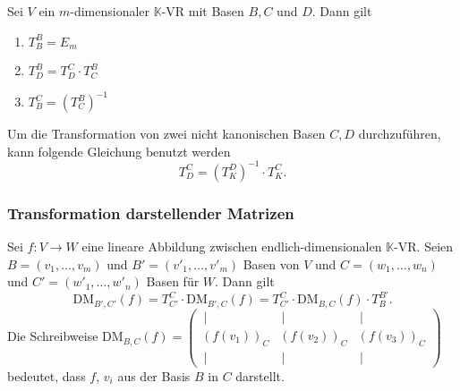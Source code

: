 \documentclass[a4paper,12pt]{article}
\begin{document}
Sei $V$ ein $m$-dimensionaler $\mathbb{K}$-VR mit Basen $B,C$ und $D$. Dann gilt
\begin{enumerate}[label=(\alph*)]
        \item $T^B_B=E_m$ 
        \item $T^B_D=T^C_D\cdot T^B_C$ 
        \item $T^C_B=\left(T^B_C\right)^{-1}$
\end{enumerate}
Um die Transformation von zwei nicht kanonischen Basen $C,D$ durchzuführen, kann folgende Gleichung benutzt werden
\[ 
        T^C_D=\left(T^D_K\right)^{-1}\cdot T^C_K
.\] 

\subsubsection{Transformation darstellender Matrizen}
Sei $f:V\rightarrow W$ eine lineare Abbildung zwischen endlich-dimensionalen $\mathbb{K}$-VR. Seien $B=\left(v_1,\hdots ,v_m\right)$ und $B'=\left(v'_1,\hdots ,v'_m\right)$ Basen von $V$ und $C=\left(w_1,\hdots ,w_n\right)$ und $C'=\left(w'_1,\hdots ,w'_n\right)$ Basen für $W$. Dann gilt
\[ 
        \text{DM}_{B',C'}\left(f\right)=T^C_{C'}\cdot \text{DM}_{B',C}\left(f\right)=T^C_{C'}\cdot \text{DM}_{B,C}\left(f\right)\cdot T^{B'}_B
.\] 
Die Schreibweise $\text{DM}_{B,C}\left(f\right)=\left(\begin{matrix} %
                \,|\, &\,|\, &\,|\, \\
                \left(f\left(v_1\right)\right)_C&\left(f\left(v_2\right)\right)_C&\left(f\left(v_3\right)\right)_C\\
                \,|\, &\,|\, &\,|\, 
\end{matrix}\right)$ bedeutet, dass $f$, $v_i$ aus der Basis $B$ in $C$ darstellt.
\end{document}
